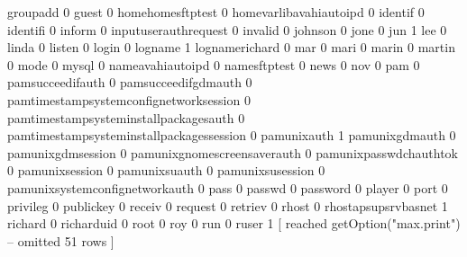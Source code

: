 \documentclass[compress,8pt]{beamer}
\begin{document}
\begin{frame}
\begin{Schunk}
  groupadd                                    0
  guest                                       0
  homehomesftptest                            0
  homevarlibavahiautoipd                      0
  identif                                     0
  identifi                                    0
  inform                                      0
  inputuserauthrequest                        0
  invalid                                     0
  johnson                                     0
  jone                                        0
  jun                                         1
  lee                                         0
  linda                                       0
  listen                                      0
  login                                       0
  logname                                     1
  lognamerichard                              0
  mar                                         0
  mari                                        0
  marin                                       0
  martin                                      0
  mode                                        0
  mysql                                       0
  nameavahiautoipd                            0
  namesftptest                                0
  news                                        0
  nov                                         0
  pam                                         0
  pamsucceedifauth                            0
  pamsucceedifgdmauth                         0
  pamtimestampsystemconfignetworksession      0
  pamtimestampsysteminstallpackagesauth       0
  pamtimestampsysteminstallpackagessession    0
  pamunixauth                                 1
  pamunixgdmauth                              0
  pamunixgdmsession                           0
  pamunixgnomescreensaverauth                 0
  pamunixpasswdchauthtok                      0
  pamunixsession                              0
  pamunixsuauth                               0
  pamunixsusession                            0
  pamunixsystemconfignetworkauth              0
  pass                                        0
  passwd                                      0
  password                                    0
  player                                      0
  port                                        0
  privileg                                    0
  publickey                                   0
  receiv                                      0
  request                                     0
  retriev                                     0
  rhost                                       0
  rhostapsupsrvbasnet                         1
  richard                                     0
  richarduid                                  0
  root                                        0
  roy                                         0
  run                                         0
  ruser                                       1
 [ reached getOption("max.print") -- omitted 51 rows ]\end{Schunk}
\end{frame}
\end{document}
